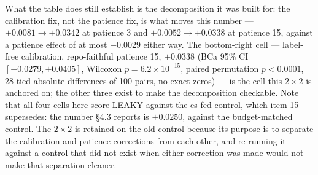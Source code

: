 \documentclass[10pt]{article} %
\begin{document}
\begin{description}
  What the table does still establish is the decomposition it was built for:
  the calibration fix, not the patience fix, is what moves this number ---
  $+0.0081\to+0.0342$ at patience 3 and $+0.0052\to+0.0338$ at patience 15,
  against a patience effect of at most $-0.0029$ either way. The
  bottom-right cell --- label-free calibration, repo-faithful patience 15,
  $+0.0338$ (BCa 95\% CI $[+0.0279,+0.0405]$, Wilcoxon
  $p=6.2\times10^{-15}$, paired permutation $p<0.0001$, 28 tied absolute
  differences of 100 pairs, no exact zeros) --- is the cell this $2\times2$
  is anchored on; the other three exist to make the decomposition checkable.
  Note that all four cells here score LEAKY against the es-fed control, which
  item 15 supersedes: the number §4.3 reports is $+0.0250$, against the
  budget-matched control. The $2\times2$ is retained on the old control
  because its purpose is to separate the calibration and patience corrections
  from each other, and re-running it against a control that did not exist when
  either correction was made would not make that separation cleaner.


\end{description}
\end{document}
